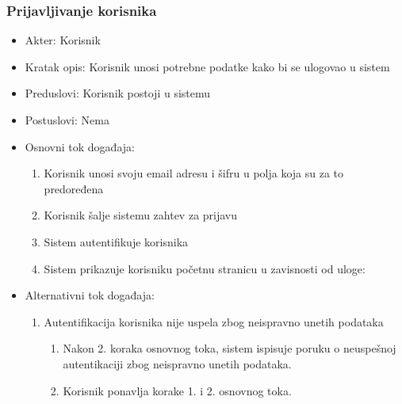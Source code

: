 \documentclass[a4paper]{article}
\begin{document}
\subsubsection{Prijavljivanje korisnika}
\begin{itemize}
    \item Akter: Korisnik
    \item Kratak opis: Korisnik unosi potrebne podatke kako bi se ulogovao u sistem
    \item Preduslovi: Korisnik postoji u sistemu
    \item Postuslovi: Nema
    \item Osnovni tok događaja:
        \begin{enumerate}
            \item Korisnik unosi svoju email adresu i šifru u polja koja su za to predoređena
            \item Korisnik šalje sistemu zahtev za prijavu
            \item Sistem autentifikuje korisnika
            \item Sistem prikazuje korisniku početnu stranicu u zavisnosti od uloge:
        \end{enumerate}
    \item Alternativni tok događaja:
        \begin{enumerate}
            \item Autentifikacija korisnika nije uspela zbog neispravno unetih podataka
                \begin{enumerate}
                    \item Nakon 2. koraka osnovnog toka, sistem ispisuje poruku o neuspešnoj autentikaciji zbog neispravno unetih podataka.
                    \item Korisnik ponavlja korake 1. i 2. osnovnog toka.

\end{enumerate}
\end{enumerate}
\end{itemize}
\end{document}
